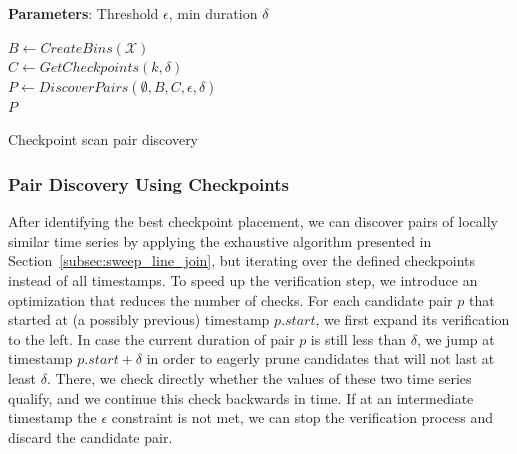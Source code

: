 \setlength{\textfloatsep}{4pt}
\begin{algorithm}[tb]
	\DontPrintSemicolon
	\begin{footnotesize}
	\nonl \textbf{Parameters}: Threshold $\epsilon$, min duration $\delta$ \\
	\vspace{4pt}
	
	$B \leftarrow CreateBins(\mathcal{X})$ \\
	$C \leftarrow GetCheckpoints(k, \delta)$ \\
	$P \leftarrow DiscoverPairs(\emptyset, B, C, \epsilon, \delta)$ \\
	\KwRet $P$ \\
	
	\vspace{4pt}
	\end{footnotesize}
	\caption{Checkpoint scan pair discovery}
	\label{alg:checkpoint_scan_sim}
\end{algorithm}


\subsubsection{Pair Discovery Using Checkpoints}
\label{subsec:checkpoint_join}
After identifying the best checkpoint placement, we can discover pairs of locally similar time series by applying the exhaustive algorithm presented in Section~\ref{subsec:sweep_line_join}, but iterating over the defined checkpoints instead of all timestamps. To speed up the verification step, we introduce an optimization that reduces the number of checks. For each candidate pair $p$ that started at (a possibly previous) timestamp $p.start$, we first expand its verification to the left. In case the current duration of pair $p$ is still less than $\delta$, we jump at timestamp $p.start + \delta$ in order to eagerly prune candidates that will not last at least $\delta$. There, we check directly whether the values of these two time series qualify, and we continue this check backwards in time. If at an intermediate timestamp the $\epsilon$ constraint is not met, we can stop the verification process and discard the candidate pair.

